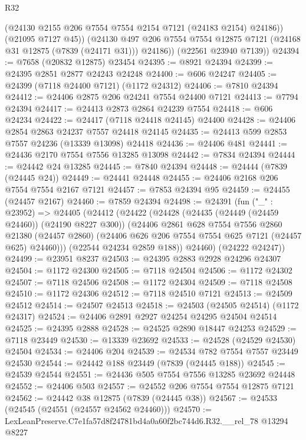 \begin{lexlean}{R32}
\begin{coremodule}
            (@24130 @2155 @206 @7554 @7554 @2154 @7121 (@24183 @2154) @24186))
          (@21095 @7127 @45))
        (@24130 @497 @206 @7554 @7554 @12875 @7121 (@24168 @31 @12875 (@7839 (@24171 @31))) @24186))
      (@22561 @23940 @7139))
@24394 := @7658 (@20832 @12875) @23454
@24395 := @8921 @24394
@24399 := @24395 @2851 @2877 @24243 @24248
@24400 := @606 @24247
@24405 := @24399 (@7118 @24400 @7121) (@1172 @24312)
@24406 := @7810 @24394
@24412 := @24406 @2875 @206 @24241 @7554 @24400 @7121
@24413 := @7794 @24394
@24417 := @24413 @2873 @2864 @24239 @7554
@24418 := @606 @24234
@24422 := @24417 (@7118 @24418 @24145) @24400
@24428 := @24406 @2854 @2863 @24237 @7557 @24418 @24145
@24435 := @24413 @599 @2853 @7557 @24236 (@13339 @13098) @24418
@24436 := @24406 @481
@24441 := @24436 @2170 @7554 @7556 @13285 @13098
@24442 := @7834 @24394
@24444 := @24442 @24 @13285
@24445 := @7840 @24394
@24448 := @24444 (@7839 (@24445 @24))
@24449 := @24441 @24448
@24455 := @24406 @2168 @206 @7554 @7554 @2167 @7121
@24457 := @7853 @24394 @95
@24459 := @24455 (@24457 @2167)
@24460 := @7859 @24394
@24498 := @24391
    (fun ("_" : @23952) =>
    @24405
      (@24412
        (@24422
          (@24428
            (@24435 (@24449 (@24459 @24460)) (@24190 @8227 @300))
            (@24406
              @2861
              @628
              @7554
              @7556
              @2860
              @21380
              (@24457 @2860)
              (@24406 @626 @206 @7554 @7554 @625 @7121 (@24457 @625) @24460)))
          (@22544 @24234 @2859 @188))
        @24460)
      (@24222 @24247))
@24499 := @23951 @8237
@24503 := @24395 @2883 @2928 @24296 @24307
@24504 := @1172 @24300
@24505 := @7118 @24504
@24506 := @1172 @24302
@24507 := @7118 @24506
@24508 := @1172 @24304
@24509 := @7118 @24508
@24510 := @1172 @24306
@24512 := @7118 @24510 @7121
@24513 := @24509 @24512
@24514 := @24507 @24513
@24518 := @24503 (@24505 @24514) (@1172 @24317)
@24524 := @24406 @2891 @2927 @24254 @24295 @24504 @24514
@24525 := @24395 @2888
@24528 := @24525 @2890 @18447 @24253
@24529 := @7118 @23449
@24530 := @13339 @23692
@24533 := @24528 (@24529 @24530) @24504
@24534 := @24406 @204
@24539 := @24534 @782 @7554 @7557 @23449 @24530
@24544 := @24442 @188 @23449 (@7839 (@24445 @188))
@24545 := @24539 @24544
@24551 := @24436 @505 @7554 @7556 @13285 @23692 @24448
@24552 := @24406 @503
@24557 := @24552 @206 @7554 @7554 @12875 @7121
@24562 := @24442 @38 @12875 (@7839 (@24445 @38))
@24567 := @24533 (@24545 (@24551 (@24557 @24562 @24460)))
@24570 := LexLeanPreserve.C7e1fa57d8f24781bd4a0a60f2bc744d6.R32.__rel_78 @13294 @8227

\end{coremodule}
\end{lexlean}
